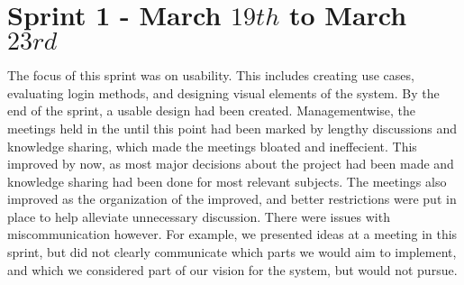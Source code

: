 \section{Sprint 1 - March $19th$ to March $23rd$}
The focus of this sprint was on usability. 
This includes creating use cases, evaluating login methods, and designing visual elements of the system. 
By the end of the sprint, a usable design had been created. \newline
Managementwise, the meetings held in the \globalgroup{} until this point had been marked by lengthy discussions and knowledge sharing, which made the meetings bloated and ineffecient. 
This improved by now, as most major decisions about the project had been made and knowledge sharing had been done for most relevant subjects. 
The meetings also improved as the organization of the \globalgroup{} improved, and better restrictions were put in place to help alleviate unnecessary discussion. \newline
There were issues with miscommunication however. 
For example, we presented ideas at a meeting in this sprint, but did not clearly communicate which parts we would aim to implement, and which we considered part of our vision for the system, but would not pursue. 